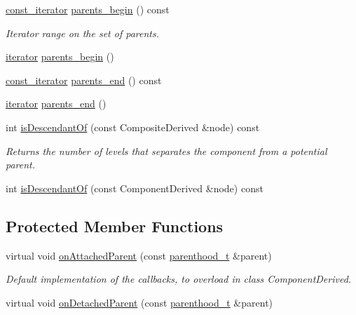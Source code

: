 {\bf }\par
\begin{DoxyCompactItemize}
\item 
\hyperlink{classocra_1_1Component_a6271631f04d2911e4369d1288074eebb}{const\+\_\+iterator} \hyperlink{classocra_1_1Component_ad140927464e2afefd563ee52751bb09f}{parents\+\_\+begin} () const
\begin{DoxyCompactList}\small\item\em Iterator range on the set of parents. \end{DoxyCompactList}\item 
\hyperlink{classocra_1_1Component_a9b76b63c3248ec96dfdaca00d712c1c9}{iterator} \hyperlink{classocra_1_1Component_aaca1c77fdf2c7d090f43a3eefb671eae}{parents\+\_\+begin} ()
\item 
\hyperlink{classocra_1_1Component_a6271631f04d2911e4369d1288074eebb}{const\+\_\+iterator} \hyperlink{classocra_1_1Component_a3d7c4568dc83d08b014ae7b8d0119e70}{parents\+\_\+end} () const
\item 
\hyperlink{classocra_1_1Component_a9b76b63c3248ec96dfdaca00d712c1c9}{iterator} \hyperlink{classocra_1_1Component_a15dc70cd778a884fd6aa27771189d091}{parents\+\_\+end} ()
\end{DoxyCompactItemize}

{\bf }\par
\begin{DoxyCompactItemize}
\item 
int \hyperlink{classocra_1_1Component_a6ed1720bbd5d8f3ef0b10aed73c36f6e}{is\+Descendant\+Of} (const Composite\+Derived \&node) const
\begin{DoxyCompactList}\small\item\em Returns the number of levels that separates the component from a potential parent. \end{DoxyCompactList}\item 
int \hyperlink{classocra_1_1Component_a27fb70e09c4e981077d42ca196301cd3}{is\+Descendant\+Of} (const Component\+Derived \&node) const
\end{DoxyCompactItemize}

\subsection*{Protected Member Functions}
{\bf }\par
\begin{DoxyCompactItemize}
\item 
virtual void \hyperlink{classocra_1_1Component_aa59ac72499ba7d314d9602b081d0b475}{on\+Attached\+Parent} (const \hyperlink{classocra_1_1Component_a70fb7cda78934a9f017c7e46c1407953}{parenthood\+\_\+t} \&parent)
\begin{DoxyCompactList}\small\item\em Default implementation of the callbacks, to overload in class Component\+Derived. \end{DoxyCompactList}\item 
virtual void \hyperlink{classocra_1_1Component_a0dd26028434be8efbebccb088ddbec65}{on\+Detached\+Parent} (const \hyperlink{classocra_1_1Component_a70fb7cda78934a9f017c7e46c1407953}{parenthood\+\_\+t} \&parent)
\end{DoxyCompactItemize}

